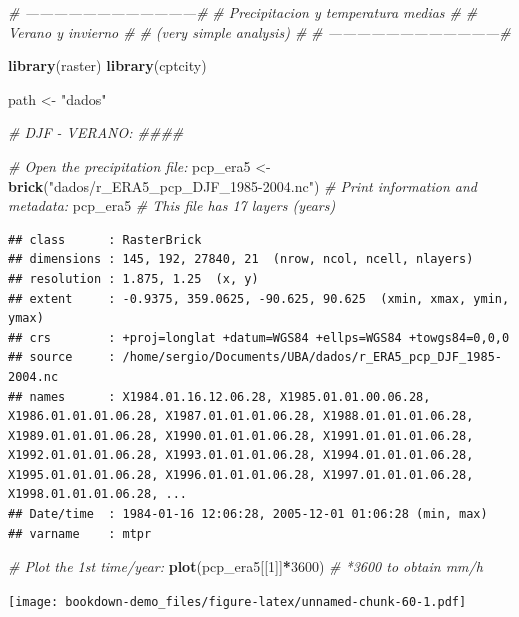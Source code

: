 \documentclass[]{book}
\newenvironment{Shaded}{\begin{snugshade}}{\end{snugshade}}
\newcommand{\CommentTok}[1]{\textcolor[rgb]{0.56,0.35,0.01}{\textit{#1}}}
\newcommand{\DecValTok}[1]{\textcolor[rgb]{0.00,0.00,0.81}{#1}}
\newcommand{\KeywordTok}[1]{\textcolor[rgb]{0.13,0.29,0.53}{\textbf{#1}}}
\newcommand{\NormalTok}[1]{#1}
\newcommand{\OperatorTok}[1]{\textcolor[rgb]{0.81,0.36,0.00}{\textbf{#1}}}
\newcommand{\StringTok}[1]{\textcolor[rgb]{0.31,0.60,0.02}{#1}}
\begin{document}
\begin{Shaded}
\begin{Highlighting}[]
\CommentTok{# ------------------------------------#}
\CommentTok{# Precipitacion y temperatura medias  #}
\CommentTok{#         Verano y invierno           #}
\CommentTok{#       (very simple analysis)        #}
\CommentTok{# ------------------------------------#}

\KeywordTok{library}\NormalTok{(raster)}
\KeywordTok{library}\NormalTok{(cptcity)}

\NormalTok{path <-}\StringTok{ "dados"}

\CommentTok{# DJF - VERANO: ####}

\CommentTok{# Open the precipitation file:}
\NormalTok{pcp_era5 <-}\StringTok{ }\KeywordTok{brick}\NormalTok{(}\StringTok{"dados/r_ERA5_pcp_DJF_1985-2004.nc"}\NormalTok{)}
\CommentTok{# Print information and metadata:}
\NormalTok{pcp_era5 }\CommentTok{# This file has 17 layers (years)}
\end{Highlighting}
\end{Shaded}

\begin{verbatim}
## class      : RasterBrick 
## dimensions : 145, 192, 27840, 21  (nrow, ncol, ncell, nlayers)
## resolution : 1.875, 1.25  (x, y)
## extent     : -0.9375, 359.0625, -90.625, 90.625  (xmin, xmax, ymin, ymax)
## crs        : +proj=longlat +datum=WGS84 +ellps=WGS84 +towgs84=0,0,0 
## source     : /home/sergio/Documents/UBA/dados/r_ERA5_pcp_DJF_1985-2004.nc 
## names      : X1984.01.16.12.06.28, X1985.01.01.00.06.28, X1986.01.01.01.06.28, X1987.01.01.01.06.28, X1988.01.01.01.06.28, X1989.01.01.01.06.28, X1990.01.01.01.06.28, X1991.01.01.01.06.28, X1992.01.01.01.06.28, X1993.01.01.01.06.28, X1994.01.01.01.06.28, X1995.01.01.01.06.28, X1996.01.01.01.06.28, X1997.01.01.01.06.28, X1998.01.01.01.06.28, ... 
## Date/time  : 1984-01-16 12:06:28, 2005-12-01 01:06:28 (min, max)
## varname    : mtpr
\end{verbatim}

\begin{Shaded}
\begin{Highlighting}[]
\CommentTok{# Plot the 1st time/year:}
\KeywordTok{plot}\NormalTok{(pcp_era5[[}\DecValTok{1}\NormalTok{]]}\OperatorTok{*}\DecValTok{3600}\NormalTok{)      }\CommentTok{# *3600 to obtain mm/h}
\end{Highlighting}
\end{Shaded}

\texttt{[image: bookdown-demo\_files/figure-latex/unnamed-chunk-60-1.pdf]}
\end{document}

